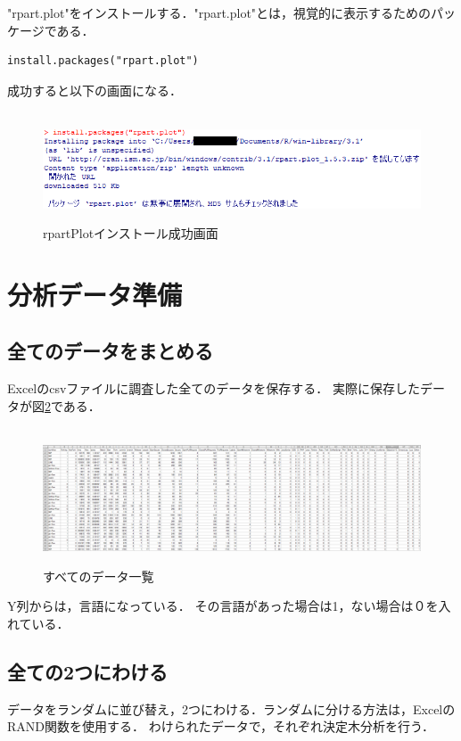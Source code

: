 "rpart.plot"をインストールする．"rpart.plot"とは，視覚的に表示するためのパッケージである．
{
\small
\begin{verbatim}
install.packages("rpart.plot")
\end{verbatim}
}
成功すると以下の画面になる．
\begin{figure}[H]
\centering　
\includegraphics[width=13cm]{rpartPlot.png}
\caption{rpartPlotインストール成功画面}\label{rpartPlot}
\end{figure}


\section{分析データ準備}


\subsection{全てのデータをまとめる}
Excelのcsvファイルに調査した全てのデータを保存する．
実際に保存したデータが図\ref{tab:itiran}である．

\begin{figure}[H]
\centering　
\includegraphics[width=13cm]{allData.png}
\caption{すべてのデータ一覧}\label{tab:itiran}
\end{figure}
Y列からは，言語になっている．
その言語があった場合は1，ない場合は０を入れている．


\subsection{全ての2つにわける}
データをランダムに並び替え，2つにわける．ランダムに分ける方法は，ExcelのRAND関数を使用する．
わけられたデータで，それぞれ決定木分析を行う．

